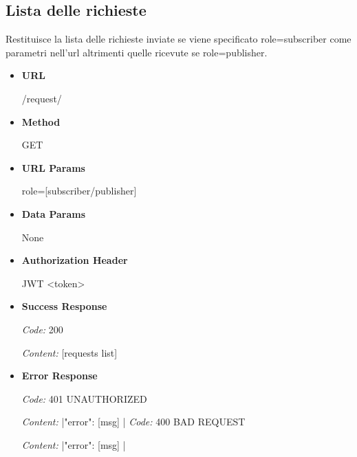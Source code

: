 \subsection{Lista delle richieste}
Restituisce la lista delle richieste inviate se viene specificato role=subscriber come parametri nell'url altrimenti quelle ricevute se role=publisher.
\begin{itemize}
\item \textbf{URL} \par
    /request/
\item \textbf{Method} \par
    GET
\item \textbf{URL Params} \par
    [default: role=subscriber] role=[subscriber/publisher]
\item \textbf{Data Params} \par
    None
\item \textbf{Authorization Header} \par
    JWT <token>
\item \textbf{Success Response} \par
    \emph{Code:} 200 \par
    \emph{Content:} [requests list]
\item \textbf{Error Response} \par
    \emph{Code:} 401 UNAUTHORIZED \par
    \emph{Content:} |{"error": [msg] }|
    \emph{Code:} 400 BAD REQUEST \par
    \emph{Content:} |{"error": [msg] }|
\end{itemize}

